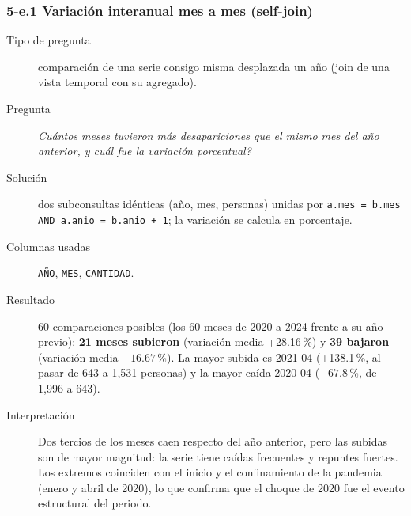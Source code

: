 \subsubsection*{5-e.1 \textbar{} Variaci\'on interanual mes a mes (self-join)}
\begin{description}
\item[Tipo de pregunta] comparaci\'on de una serie consigo misma desplazada un a\~no (join de una
      vista temporal con su agregado).
\item[Pregunta] \emph{Cu\'antos meses tuvieron m\'as desapariciones que el mismo mes del a\~no
      anterior, y cu\'al fue la variaci\'on porcentual?}
\item[Soluci\'on] dos subconsultas id\'enticas (a\~no, mes, personas) unidas por
      \texttt{a.mes = b.mes AND a.anio = b.anio + 1}; la variaci\'on se calcula en porcentaje.
\item[Columnas usadas] \texttt{A\~NO}, \texttt{MES}, \texttt{CANTIDAD}.
\item[Resultado] 60 comparaciones posibles (los 60 meses de 2020 a 2024 frente a su a\~no previo):
      \textbf{21 meses subieron} (variaci\'on media +28.16\,\%) y \textbf{39 bajaron} (variaci\'on
      media $-16.67$\,\%). La mayor subida es 2021-04 (+138.1\,\%, al pasar de 643 a 1,531 personas) y la mayor ca\'ida
      2020-04 ($-67.8$\,\%, de 1,996 a 643).
\item[Interpretaci\'on] Dos tercios de los meses caen respecto del a\~no anterior, pero las
      subidas son de mayor magnitud: la serie tiene ca\'idas frecuentes y repuntes fuertes. Los
      extremos coinciden con el inicio y el confinamiento de la pandemia (enero y abril de 2020),
      lo que confirma que el choque de 2020 fue el evento estructural del periodo.
\end{description}

